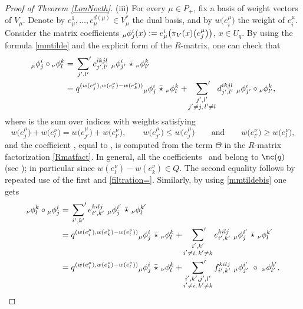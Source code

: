 \begin{proof}[Proof of Theorem \ref{LonNoeth}]
(iii) For every $\mu\in P_+$, fix a basis of weight vectors  of $V_\mu$. Denote by $e^1_\mu,\dots,e^{d(\mu)}_\mu\!\in V_\mu^*$ the dual basis, and by $w\big(e_i^\mu\big)$ the weight of $e_i^\mu$. Consider the matrix coefficients ${}_{\mu}\phi^i_j(x) :=\smash{ e^i_\mu\big(\pi_V(x)\big(e_j^\mu\big)\big)}$, $x\in U_q$. By using the formula \eqref{mmtilde} and the explicit form of the $R$-matrix, one can check that
\begin{align}
{}_{{\mu}}\phi^i_j \circ {}_{{\nu}}\phi^k_l & = \sideset{}{'}\sum_{j',l'} c_{j',l'}^{ikjl}\ {}_{{\mu}}\phi^i_{j'} \ \bar{\star} \ {}_{{\nu}}\phi^k_{l'}\nonumber \\ & = q^{(w(e_j^\mu),w(e_l^\nu)-w(e_k^\nu))} {}_{{\mu}}\phi^i_{j} \ \bar{\star} \ {}_{{\nu}}\phi^k_{l} + \sideset{}{'}\sum_{\substack{j',l'\\ j'\ne j,\, l'\ne l}} d_{j',l'}^{ikjl}\ {}_{{\mu}}\phi^i_{j'} \circ {}_{{\nu}}\phi^k_{l'},\label{prodcirc1}
\end{align}
where  is the sum over indices with weights satisfying
\[
w\big(e_j^\mu\big) + w\big(e_l^\nu\big) = w\big(e_{j'}^\mu\big) + w\big(e_{l'}^\nu\big), \qquad w\big(e_{j'}^\mu\big)\leq w\big(e_{j}^\mu\big)
\qquad \text{and} \qquad w\big(e_{l'}^\nu\big)\geq w\big(e_{l}^\nu\big),
\]
 and the coefficient , equal to , is computed from the term $\Theta$ in the $R$-matrix factorization \eqref{Rmatfact}. In general, all the coefficients~ and  belong to $\mc(q)$ (see \cite[Proposition 4.1]{BR}); in particular  since $w(e_l^\nu)-w(e_k^\nu)\in Q$. The second equality follows by repeated use of the first and \eqref{filtration=}. Similarly, by using \eqref{mmtildebis} one gets
\begin{align*}
{}_{{\nu}}\phi^k_l \circ {}_{{\mu}}\phi^i_j & = \sideset{}{'}\sum_{i',k'} e_{i',k'}^{kilj}\ {}_{{\mu}}\phi^{i'}_{j} \ \bar{\star} \ {}_{{\nu}}\phi^{k'}_{l}\\
 & = q^{(w(e_i^\mu),w(e_k^\nu)-w(e_l^\nu))} {}_{{\mu}}\phi^i_{j} \ \bar{\star} \ {}_{{\nu}}\phi^k_{l} + \sideset{}{'}\sum_{\substack{i',k'\\ i'\ne i,\, k'\ne k}} e_{i',k'}^{kilj}\ {}_{{\mu}}\phi^{i'}_{j} \ \bar{\star}\ {}_{{\nu}}\phi^{k'}_{l}\\
 & = q^{(w(e_i^\mu),w(e_k^\nu)-w(e_l^\nu))} {}_{{\mu}}\phi^i_{j} \ \bar{\star} \ {}_{{\nu}}\phi^k_{l} + \sideset{}{'}\sum_{\substack{i',k',j',l'\\ i'\ne i,\, k'\ne k}} f_{i',k'}^{kilj}\ {}_{{\mu}}\phi^{i'}_{j'} \ \circ\ {}_{{\nu}}\phi^{k'}_{l'},

\end{align*}
\end{proof}
